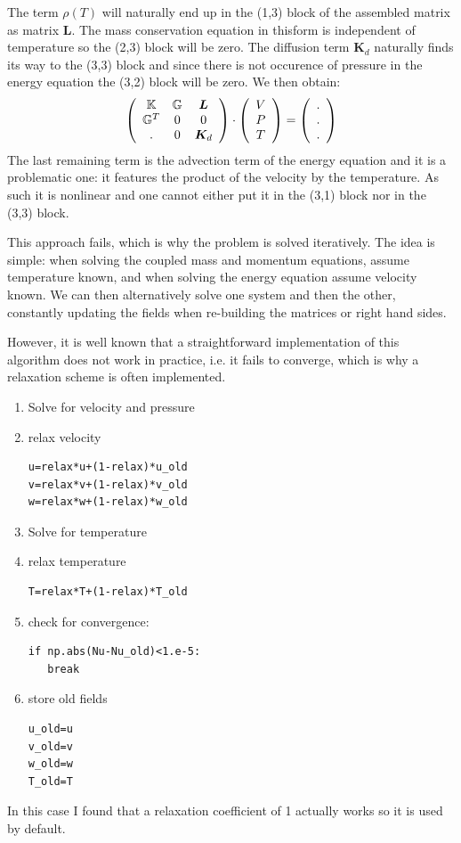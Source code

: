 The term $\rho(T)$ will naturally end up in the (1,3) block of the assembled matrix as matrix ${\bm L}$.
The mass conservation equation in thisform is independent of temperature so the (2,3) block 
will be zero. The diffusion term ${\bm K}_d$ naturally finds its way to the (3,3) 
block and since there is not occurence of pressure in the energy equation the (3,2) 
block will be zero. We then obtain:
\[
\left(
\begin{array}{ccc}
{\mathbb{K}} & {\mathbb{G}} & {\bm L} \\
{\mathbb{G}}^T & 0 & 0 \\
. & 0 & {\bm K}_d 
\end{array}
\right)
\cdot
\left(
\begin{array}{c}
V \\ P \\ T 
\end{array}
\right)
=
\left(
\begin{array}{c}
. \\ . \\ .
\end{array}
\right)
\]
The last remaining term is the advection term of the energy equation and it is a problematic one:
it features the product of the velocity by the temperature. As such it is nonlinear and one cannot 
either put it in the (3,1) block nor in the (3,3) block. 

This approach fails, which is why 
the problem is solved iteratively. The idea is simple: when solving the 
coupled mass and momentum equations, assume temperature known, and when solving the energy equation
assume velocity known. We can then alternatively solve one system and then the other, constantly 
updating the fields when re-building the matrices or right hand sides.

However, it is well known that a straightforward implementation of this algorithm does not 
work in practice, i.e. it fails to converge, which is why a relaxation scheme is often implemented.
\begin{enumerate}
\item Solve for velocity and pressure
\item relax velocity
\begin{lstlisting}
u=relax*u+(1-relax)*u_old
v=relax*v+(1-relax)*v_old
w=relax*w+(1-relax)*w_old
\end{lstlisting}
\item Solve for temperature
\item relax temperature
\begin{lstlisting}
T=relax*T+(1-relax)*T_old
\end{lstlisting}
\item check for convergence:
\begin{lstlisting}
if np.abs(Nu-Nu_old)<1.e-5:
   break
\end{lstlisting}
\item store old fields
\begin{lstlisting}
u_old=u
v_old=v
w_old=w
T_old=T
\end{lstlisting}
\end{enumerate}
In this case I found that a relaxation coefficient of 1 actually works so it is used by default.


